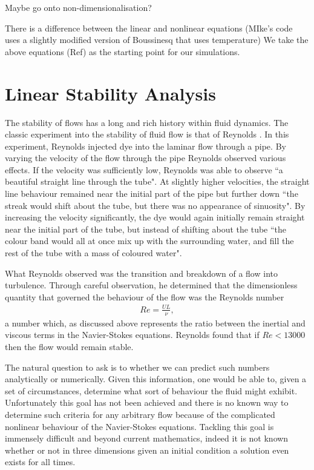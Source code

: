 Maybe go onto non-dimensionalisation? 

There is a difference between the linear and nonlinear equations (MIke's code uses a slightly modified version of Boussinesq that uses temperature) 
We take the above equations (Ref) as the starting point for our simulations. 

\section{Linear Stability Analysis}
The stability of flows has a long and rich history within fluid dynamics. The classic experiment into the stability of fluid flow is that of  Reynolds \cite{reynolds1883}. In this experiment, Reynolds injected dye into the laminar flow through a pipe. By varying the velocity of the flow through the pipe Reynolds observed various effects. If the velocity was sufficiently low, Reynolds was able to observe ``a beautiful straight line through the tube". At slightly higher velocities, the straight line behaviour remained near the initial part of the pipe but further down ``the streak would shift about the tube, but there was no appearance of sinuosity". By increasing the velocity significantly, the dye would again initially remain straight near the initial part of the tube, but instead of shifting about the tube ``the colour band would all at once mix up with the surrounding water, and fill the rest of the tube with a mass of coloured water". 

What Reynolds observed was the transition and breakdown of a flow into turbulence. Through careful observation, he determined that the dimensionless quantity that governed the behaviour of the flow was the Reynolds number 
\begin{align}
Re =\frac{UL}{\nu},
\end{align}
a number which, as discussed above represents the ratio between the inertial and viscous terms in the Navier-Stokes equations. Reynolds found that if $Re<13000$ then the flow would remain stable. 

The natural question to ask is to whether we can predict such numbers analytically or numerically. Given this information, one would be able to, given a set of circumstances, determine what sort of behaviour the fluid might exhibit. Unfortunately this goal has not been achieved and there is no known way to determine such criteria for any arbitrary flow because of the complicated nonlinear behaviour of the Navier-Stokes equations. Tackling this goal is immensely difficult and beyond current mathematics, indeed it is not known whether or not in three dimensions given an initial condition a solution even exists for all times.

